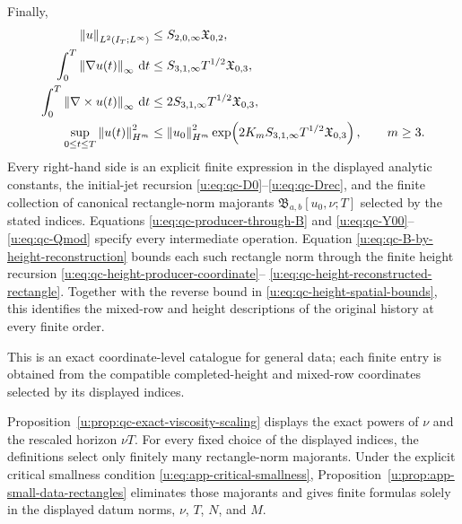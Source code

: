 {\begin{theorem}
Finally,
\begin{align}
 \left\lVert u\right\rVert_{L^2(I_T;L^\infty)}
 &\le S_{2,0,\infty}\mathfrak X_{0,2},
 \label{u:eq:qc-sharp-L2Linfty}\\
 \int_0^T\left\lVert \nabla u(t)\right\rVert_\infty\,\mathrm d t
 &\le S_{3,1,\infty}T^{1/2}\mathfrak X_{0,3},
 \label{u:eq:qc-sharp-lipschitz-action}\\
 \int_0^T\left\lVert \nabla\times u(t)\right\rVert_\infty\,\mathrm d t
 &\le2S_{3,1,\infty}T^{1/2}\mathfrak X_{0,3},
 \label{u:eq:qc-sharp-vorticity-action}\\
 \sup_{0\le t\le T}\left\lVert u(t)\right\rVert_{H^m}^2
 &\le\left\lVert u_0\right\rVert_{H^m}^2
 \exp\!\left(
 2K_mS_{3,1,\infty}T^{1/2}\mathfrak X_{0,3}
 \right),
 \qquad m\ge3.
 \label{u:eq:qc-sharp-continuation-growth}
\end{align}
Every right-hand side is an explicit finite expression in the displayed
analytic constants, the initial-jet recursion
\eqref{u:eq:qc-D0}--\eqref{u:eq:qc-Drec}, and the finite collection of canonical
rectangle-norm majorants \(\mathfrak B_{a,b}[u_0,\nu;T]\) selected by the stated
indices.  Equations \eqref{u:eq:qc-producer-through-B} and
\eqref{u:eq:qc-Y00}--\eqref{u:eq:qc-Qmod} specify every intermediate operation.
Equation \eqref{u:eq:qc-B-by-height-reconstruction} bounds each such
rectangle norm through the finite height recursion
\eqref{u:eq:qc-height-producer-coordinate}--%
\eqref{u:eq:qc-height-reconstructed-rectangle}.  Together with the reverse
bound in \eqref{u:eq:qc-height-spatial-bounds}, this identifies the mixed-row
and height descriptions of the original history at every finite order.
\begin{samepage}
This is an exact coordinate-level catalogue for general data; each finite
entry is obtained from the compatible completed-height and mixed-row
coordinates selected by its displayed indices.\par
\end{samepage}
Proposition~\ref{u:prop:qc-exact-viscosity-scaling} displays the exact powers of
\(\nu\) and the rescaled horizon \(\nu T\).  For every fixed choice of the
displayed indices, the definitions select only finitely many rectangle-norm
majorants.
Under the explicit critical smallness condition
\eqref{u:eq:app-critical-smallness}, Proposition~\ref{u:prop:app-small-data-rectangles}
eliminates those majorants and gives finite formulas solely in the
displayed datum norms, \(\nu\), \(T\), \(N\), and \(M\).
\end{theorem}

}
